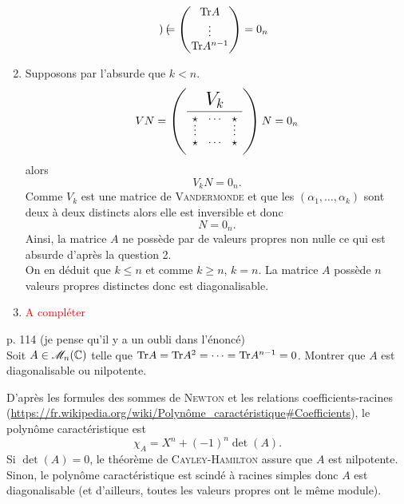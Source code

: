 \begin{solution}
\begin{enumerate}
\begin{align*}
\begin{pmatrix}
            \end{pmatrix}
            = 
            \begin{pmatrix}
                \mathrm{Tr}{A} \\ \vdots \\ \mathrm{Tr}{A^{n-1}}
            \end{pmatrix}
            =
            0_n
        \end{align*}
        \item Supposons par l'absurde que $k < n$. \\
        $$V N = \vandermondepartiel N = 0_n$$
        alors 
        $$V_k N = 0_n.$$
        Comme $V_k$ est une matrice de \textsc{Vandermonde} et que les $(\alpha_1, \dots, \alpha_k)$ sont deux à deux distincts alors elle est inversible et donc
        $$N = 0_n.$$
        Ainsi, la matrice $A$ ne possède par de valeurs propres non nulle ce qui est absurde d'après la question 2. \\
        On en déduit que $k \leqslant n$ et comme $k \geqslant n$, $k=n$. La matrice $A$ possède $n$ valeurs propres distinctes donc est diagonalisable.
        \item \textcolor{red}{A compléter}
        \end{enumerate}
\end{solution}

\begin{exercice}
    \cite{reduc_des_endo} p. 114 (je pense qu'il y a un oubli dans l'énoncé)\\
    Soit $A \in \mathscr{M}_n(\mathbb{C})$ telle que $\mathrm{Tr}{A} = \mathrm{Tr}{A^2} = \cdots = \mathrm{Tr}{A^{n-1}} = 0$. Montrer que $A$ est diagonalisable ou nilpotente. 
\end{exercice}

\begin{elem_sol}
    D'après les formules des sommes de \textsc{Newton} et les relations coefficients-racines (\url{https://fr.wikipedia.org/wiki/Polynôme_caractéristique#Coefficients}), le polynôme caractéristique est 
    $$\chi_A = X^n + (-1)^n \det(A).$$
    Si $\det(A) = 0$, le théorème de \textsc{Cayley}-\textsc{Hamilton} assure que $A$ est nilpotente. Sinon, le polynôme caractéristique est scindé à racines simples donc $A$ est diagonalisable (et d'ailleurs, toutes les valeurs propres ont le même module).
\end{elem_sol}